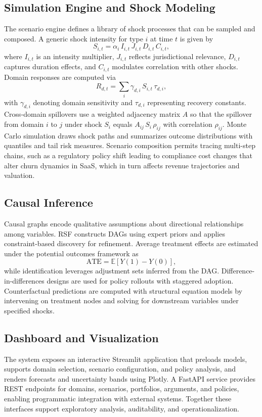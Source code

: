 \documentclass[conference]{IEEEtran}
\begin{document}
\subsection{Simulation Engine and Shock Modeling}
The scenario engine defines a library of shock processes that can be sampled and composed. A generic shock intensity for type $i$ at time $t$ is given by
\begin{equation}
S_{i,t} = \alpha_i\,I_{i,t}\,J_{i,t}\,D_{i,t}\,C_{i,t},
\end{equation}
where $I_{i,t}$ is an intensity multiplier, $J_{i,t}$ reflects jurisdictional relevance, $D_{i,t}$ captures duration effects, and $C_{i,t}$ modulates correlation with other shocks. Domain responses are computed via
\begin{equation}
R_{d,t} = \sum_i \gamma_{d,i}\,S_{i,t}\,\tau_{d,i},
\end{equation}
with $\gamma_{d,i}$ denoting domain sensitivity and $\tau_{d,i}$ representing recovery constants. Cross-domain spillovers use a weighted adjacency matrix $A$ so that the spillover from domain $i$ to $j$ under shock $S_i$ equals $A_{ij}\,S_i\,\rho_{ij}$ with correlation $\rho_{ij}$. Monte Carlo simulation draws shock paths and summarizes outcome distributions with quantiles and tail risk measures. Scenario composition permits tracing multi-step chains, such as a regulatory policy shift leading to compliance cost changes that alter churn dynamics in SaaS, which in turn affects revenue trajectories and valuation.

\subsection{Causal Inference}
Causal graphs encode qualitative assumptions about directional relationships among variables. RSF constructs DAGs using expert priors and applies constraint-based discovery for refinement. Average treatment effects are estimated under the potential outcomes framework as
\begin{equation}
\mathrm{ATE} = \mathbb{E}[Y(1)-Y(0)],
\end{equation}
while identification leverages adjustment sets inferred from the DAG. Difference-in-differences designs are used for policy rollouts with staggered adoption. Counterfactual predictions are computed with structural equation models by intervening on treatment nodes and solving for downstream variables under specified shocks.

\subsection{Dashboard and Visualization}
The system exposes an interactive Streamlit application that preloads models, supports domain selection, scenario configuration, and policy analysis, and renders forecasts and uncertainty bands using Plotly. A FastAPI service provides REST endpoints for domains, scenarios, portfolios, arguments, and policies, enabling programmatic integration with external systems. Together these interfaces support exploratory analysis, auditability, and operationalization.
\end{document}
